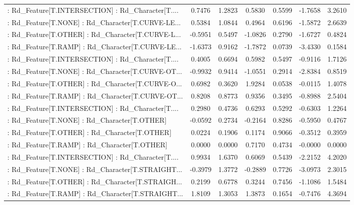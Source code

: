 \begin{longtable}{p{4cm}cccccc}
 : Rd\_Feature[T.INTERSECTION] : Rd\_Character[T.... &  0.7476 &    1.2823 &  0.5830 &       0.5599 & -1.7658 &  3.2610 \\
 : Rd\_Feature[T.NONE] : Rd\_Character[T.CURVE-LE... &  0.5384 &    1.0844 &  0.4964 &       0.6196 & -1.5872 &  2.6639 \\
 : Rd\_Feature[T.OTHER] : Rd\_Character[T.CURVE-L... & -0.5951 &    0.5497 & -1.0826 &       0.2790 & -1.6727 &  0.4824 \\
 : Rd\_Feature[T.RAMP] : Rd\_Character[T.CURVE-LE... & -1.6373 &    0.9162 & -1.7872 &       0.0739 & -3.4330 &  0.1584 \\
 : Rd\_Feature[T.INTERSECTION] : Rd\_Character[T.... &  0.4005 &    0.6694 &  0.5982 &       0.5497 & -0.9116 &  1.7126 \\
 : Rd\_Feature[T.NONE] : Rd\_Character[T.CURVE-OT... & -0.9932 &    0.9414 & -1.0551 &       0.2914 & -2.8384 &  0.8519 \\
 : Rd\_Feature[T.OTHER] : Rd\_Character[T.CURVE-O... &  0.6982 &    0.3620 &  1.9284 &       0.0538 & -0.0115 &  1.4078 \\
 : Rd\_Feature[T.RAMP] : Rd\_Character[T.CURVE-OT... &  0.8208 &    0.8773 &  0.9356 &       0.3495 & -0.8988 &  2.5404 \\
 : Rd\_Feature[T.INTERSECTION] : Rd\_Character[T.... &  0.2980 &    0.4736 &  0.6293 &       0.5292 & -0.6303 &  1.2264 \\
 : Rd\_Feature[T.NONE] : Rd\_Character[T.OTHER]      & -0.0592 &    0.2734 & -0.2164 &       0.8286 & -0.5950 &  0.4767 \\
 : Rd\_Feature[T.OTHER] : Rd\_Character[T.OTHER]     &  0.0224 &    0.1906 &  0.1174 &       0.9066 & -0.3512 &  0.3959 \\
 : Rd\_Feature[T.RAMP] : Rd\_Character[T.OTHER]      &  0.0000 &    0.0000 &  0.7170 &       0.4734 & -0.0000 &  0.0000 \\
 : Rd\_Feature[T.INTERSECTION] : Rd\_Character[T.... &  0.9934 &    1.6370 &  0.6069 &       0.5439 & -2.2152 &  4.2020 \\
 : Rd\_Feature[T.NONE] : Rd\_Character[T.STRAIGHT... & -0.3979 &    1.3772 & -0.2889 &       0.7726 & -3.0973 &  2.3015 \\
 : Rd\_Feature[T.OTHER] : Rd\_Character[T.STRAIGH... &  0.2199 &    0.6778 &  0.3244 &       0.7456 & -1.1086 &  1.5484 \\
 : Rd\_Feature[T.RAMP] : Rd\_Character[T.STRAIGHT... &  1.8109 &    1.3053 &  1.3873 &       0.1654 & -0.7476 &  4.3694 \\

\end{longtable}
